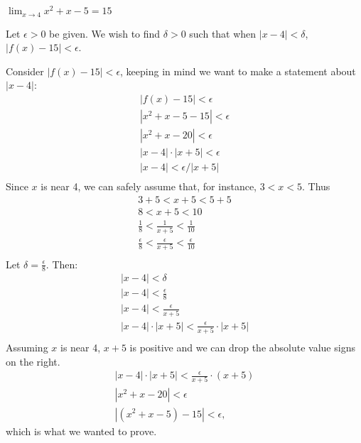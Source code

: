 {$\displaystyle \lim_{x\to 4} x^2+x-5 = 15$}
{Let $\epsilon >0$ be given. We wish to find $\delta >0$ such that when $|x-4|<\delta$, $|f(x)-15|<\epsilon$. 

Consider $|f(x)-15|<\epsilon$, keeping in  mind we want to make a statement about $|x-4|$:
\begin{gather*}
|f(x) -15 | < \epsilon \\
|x^2+x-5 -15 |<\epsilon \\
| x^2+x-20 | < \epsilon \\
| x-4 |\cdot|x+5| < \epsilon \\
| x-4 | < \epsilon/|x+5| \\
\end{gather*}
Since $x$ is near 4, we can safely assume that, for instance, $3<x<5$. Thus
\begin{gather*}
3+5<x+5<5+5 \\
8 < x+5 < 10 \\
\frac{1}{8} < \frac{1}{x+5} < \frac{1}{10} \\
\frac{\epsilon}{8} < \frac{\epsilon}{x+5} < \frac{\epsilon}{10} \\
\end{gather*}
Let $\delta =\frac{\epsilon}{8}$. Then:
\begin{gather*}
|x-4|<\delta \\
|x-4| < \frac{\epsilon}8\\
|x-4| < \frac{\epsilon}{x+5}\\
|x-4|\cdot|x+5| < \frac{\epsilon}{x+5}\cdot|x+5|\\
\end{gather*}
Assuming $x$ is near 4, $x+5$ is positive and we can drop the absolute value signs on the right.
\begin{gather*}
|x-4|\cdot|x+5| < \frac{\epsilon}{x+5}\cdot(x+5)\\
|x^2+x-20| < \epsilon\\
|(x^2+x-5) -15| < \epsilon,
\end{gather*}
which is what we wanted to prove.
}


